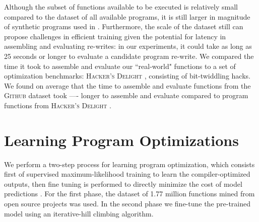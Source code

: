 \documentclass{article}
\newcommand{\GH}{\textsc{Github}}
\begin{document}

Although the subset of functions available to be executed is relatively small compared to the dataset of all available programs, it is still larger in magnitude of synthetic programs used in \cite{shi2020}. Furthermore, the scale of the dataset still can propose challenges in efficient training given the potential for latency in assembling and evaluating re-writes: in our experiments, it could take as long as 25 seconds or longer to evaluate a candidate program re-write. We compared the time it took to assemble and evaluate our ``real-world" functions to a set of optimization benchmarks: \textsc{Hacker's Delight} \cite{warren2013hacker}, consisting of bit-twiddling hacks. We found on average that the time to assemble and evaluate functions from the \GH{} dataset took ---- longer to assemble and evaluate compared to program functions from \textsc{Hacker's Delight} . 

\section{Learning Program Optimizations}

We perform a two-step process for learning program optimization, which consists first of supervised maximum-likelihood training to learn the compiler-optimized outputs, then fine tuning is performed to directly minimize the cost of model predictions .
For the first phase, the dataset of 1.77 million functions mined from open source projects was used. In the second phase we fine-tune the pre-trained model using an iterative-hill climbing algorithm. 
\end{document}
